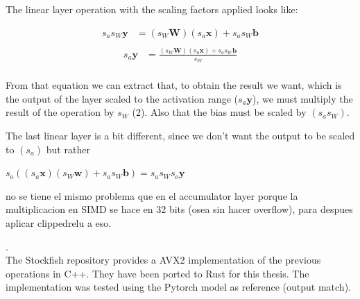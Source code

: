 The linear layer operation with the scaling factors applied looks like:

\begin{equation}
\begin{aligned}
s_a s_W \bm{y} &= (s_W \bm{W}) (s_a \bm{x}) + s_a s_W \bm{b} \\
\end{aligned}
\end{equation}
\begin{equation}
\begin{aligned}
s_a \bm{y} &= \frac{(s_W \bm{W}) (s_a \bm{x}) + s_a s_W \bm{b}}{s_W} \\
\end{aligned}
\end{equation}

From that equation we can extract that, to obtain the result we want, which is the output of the layer scaled to the activation range ($s_a \bm{y}$), we must multiply the result of the operation by $s_W$ (2). Also that the bias must be scaled by $(s_a s_W)$.

The last linear layer is a bit different, since we don't want the output to be scaled to $(s_a)$ but rather

\vspace{1cm}
$s_o ((s_a \bm{x}) (s_W \bm{w}) + s_a s_W \bm{b}) = s_a s_W s_o \bm{y}$







no se tiene el mismo problema que en el accumulator layer porque la multiplicacion en SIMD se hace en 32 bits (osea sin hacer overflow), para despues aplicar clippedrelu a eso.

. \\

The Stockfish repository provides a AVX2 implementation of the previous operations in C++. They have been ported to Rust for this thesis. The implementation was tested using the Pytorch model as reference (output match).

